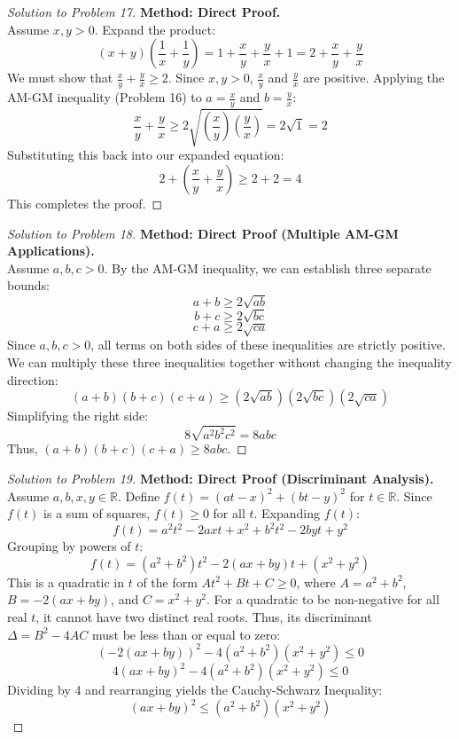 \documentclass[11pt]{article}
\begin{document}
\begin{proof}[Solution to Problem 17]
    \textbf{Method: Direct Proof.} \\
    Assume $x, y > 0$. Expand the product:
    \[ (x + y)\left(\frac{1}{x} + \frac{1}{y}\right) = 1 + \frac{x}{y} + \frac{y}{x} + 1 = 2 + \frac{x}{y} + \frac{y}{x} \]
    We must show that $\frac{x}{y} + \frac{y}{x} \ge 2$. Since $x, y > 0$, $\frac{x}{y}$ and $\frac{y}{x}$ are positive. Applying the AM-GM inequality (Problem 16) to $a = \frac{x}{y}$ and $b = \frac{y}{x}$:
    \[ \frac{x}{y} + \frac{y}{x} \ge 2\sqrt{\left(\frac{x}{y}\right)\left(\frac{y}{x}\right)} = 2\sqrt{1} = 2 \]
    Substituting this back into our expanded equation:
    \[ 2 + \left(\frac{x}{y} + \frac{y}{x}\right) \ge 2 + 2 = 4 \]
    This completes the proof.
\end{proof}

\begin{proof}[Solution to Problem 18]
    \textbf{Method: Direct Proof (Multiple AM-GM Applications).} \\
    Assume $a, b, c > 0$. By the AM-GM inequality, we can establish three separate bounds:
    \[ a + b \ge 2\sqrt{ab} \]
    \[ b + c \ge 2\sqrt{bc} \]
    \[ c + a \ge 2\sqrt{ca} \]
    Since $a, b, c > 0$, all terms on both sides of these inequalities are strictly positive. We can multiply these three inequalities together without changing the inequality direction:
    \[ (a + b)(b + c)(c + a) \ge (2\sqrt{ab})(2\sqrt{bc})(2\sqrt{ca}) \]
    Simplifying the right side:
    \[ 8\sqrt{a^2 b^2 c^2} = 8abc \]
    Thus, $(a + b)(b + c)(c + a) \ge 8abc$.
\end{proof}

\begin{proof}[Solution to Problem 19]
    \textbf{Method: Direct Proof (Discriminant Analysis).} \\
    Assume $a, b, x, y \in \mathbb{R}$. Define $f(t) = (at - x)^2 + (bt - y)^2$ for $t \in \mathbb{R}$. Since $f(t)$ is a sum of squares, $f(t) \ge 0$ for all $t$. Expanding $f(t)$:
    \[ f(t) = a^2 t^2 - 2axt + x^2 + b^2 t^2 - 2byt + y^2 \]
    Grouping by powers of $t$:
    \[ f(t) = (a^2 + b^2)t^2 - 2(ax + by)t + (x^2 + y^2) \]
    This is a quadratic in $t$ of the form $At^2 + Bt + C \ge 0$, where $A = a^2 + b^2$, $B = -2(ax + by)$, and $C = x^2 + y^2$. For a quadratic to be non-negative for all real $t$, it cannot have two distinct real roots. Thus, its discriminant $\Delta = B^2 - 4AC$ must be less than or equal to zero:
    \[ (-2(ax + by))^2 - 4(a^2 + b^2)(x^2 + y^2) \le 0 \]
    \[ 4(ax + by)^2 - 4(a^2 + b^2)(x^2 + y^2) \le 0 \]
    Dividing by 4 and rearranging yields the Cauchy-Schwarz Inequality:
    \[ (ax + by)^2 \le (a^2 + b^2)(x^2 + y^2) \]
\end{proof}
\end{document}
